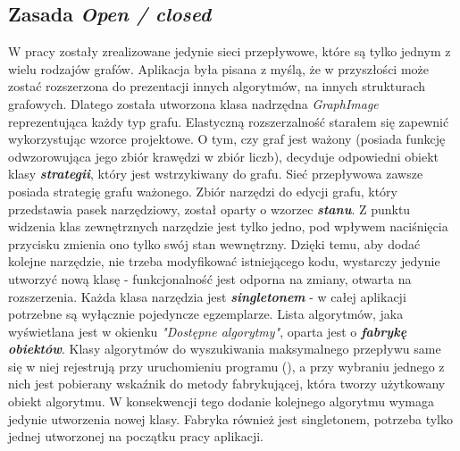 \subsection{Zasada \textit{Open / closed}}
W pracy zostały zrealizowane jedynie sieci przepływowe, które są tylko jednym z wielu rodzajów grafów. Aplikacja była pisana z myślą, że w przyszłości może zostać rozszerzona do prezentacji innych algorytmów, na innych strukturach grafowych. Dlatego została utworzona klasa nadrzędna \emph{GraphImage} reprezentująca każdy typ grafu. Elastyczną rozszerzalność starałem się zapewnić wykorzystując wzorce projektowe. O tym, czy graf jest ważony (posiada funkcję odwzorowująca jego zbiór krawędzi w zbiór liczb), decyduje odpowiedni obiekt klasy \textbf{\textit{strategii}}, który jest wstrzykiwany do grafu. Sieć przepływowa zawsze posiada strategię grafu ważonego. Zbiór narzędzi do edycji grafu, który przedstawia pasek narzędziowy, został oparty o wzorzec \textbf{\textit{stanu}}. Z punktu widzenia klas zewnętrznych narzędzie jest tylko jedno, pod wpływem naciśnięcia przycisku zmienia ono tylko swój stan wewnętrzny. Dzięki temu, aby dodać kolejne narzędzie, nie trzeba modyfikować istniejącego kodu, wystarczy jedynie utworzyć nową klasę - funkcjonalność jest odporna na zmiany, otwarta na rozszerzenia. Każda klasa narzędzia jest \textbf{\textit{singletonem}} - w całej aplikacji potrzebne są wyłącznie pojedyncze egzemplarze. Lista algorytmów, jaka wyświetlana jest w okienku \textit{"Dostępne algorytmy"}, oparta  jest o \textbf{\textit{fabrykę obiektów}}. Klasy algorytmów do wyszukiwania maksymalnego przepływu same się w niej rejestrują przy uruchomieniu programu (\cite{id:WzorceCppFabryka}), a przy wybraniu jednego z nich jest pobierany wskaźnik do metody fabrykującej, która tworzy użytkowany obiekt algorytmu. W konsekwencji tego dodanie kolejnego algorytmu wymaga jedynie utworzenia nowej klasy. Fabryka również jest singletonem, potrzeba tylko jednej utworzonej na początku pracy aplikacji.
